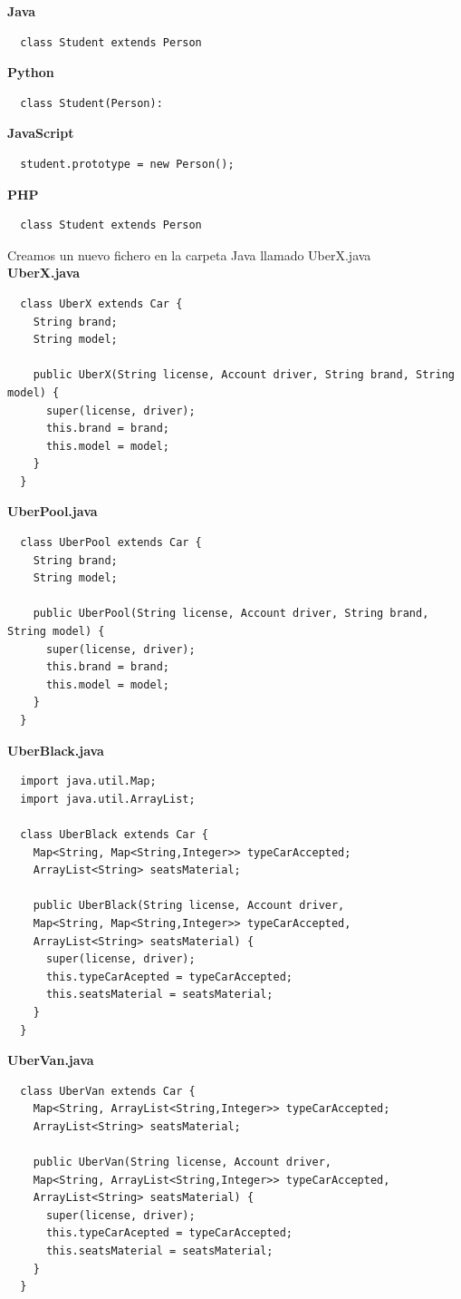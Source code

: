 \documentclass{article}
\begin{document}
\textbf{Java}
\begin{verbatim}
  class Student extends Person
\end{verbatim}

\textbf{Python}
\begin{verbatim}
  class Student(Person):
\end{verbatim}

\textbf{JavaScript}
\begin{verbatim}
  student.prototype = new Person();
\end{verbatim}

\textbf{PHP}
\begin{verbatim}
  class Student extends Person
\end{verbatim}

Creamos un nuevo fichero en la carpeta Java llamado UberX.java\\

\textbf{UberX.java}
\begin{verbatim}
  class UberX extends Car {
    String brand;
    String model;

    public UberX(String license, Account driver, String brand, String model) {
      super(license, driver);
      this.brand = brand;
      this.model = model;
    }
  }
\end{verbatim}

\textbf{UberPool.java}
\begin{verbatim}
  class UberPool extends Car {
    String brand;
    String model;

    public UberPool(String license, Account driver, String brand, String model) {
      super(license, driver);
      this.brand = brand;
      this.model = model;
    }
  }
\end{verbatim}

\textbf{UberBlack.java}
\begin{verbatim}
  import java.util.Map;
  import java.util.ArrayList;

  class UberBlack extends Car {
    Map<String, Map<String,Integer>> typeCarAccepted;
    ArrayList<String> seatsMaterial;

    public UberBlack(String license, Account driver,
    Map<String, Map<String,Integer>> typeCarAccepted,
    ArrayList<String> seatsMaterial) {
      super(license, driver);
      this.typeCarAcepted = typeCarAccepted;
      this.seatsMaterial = seatsMaterial;
    }
  }
\end{verbatim}

\textbf{UberVan.java}
\begin{verbatim}
  class UberVan extends Car {
    Map<String, ArrayList<String,Integer>> typeCarAccepted;
    ArrayList<String> seatsMaterial;

    public UberVan(String license, Account driver,
    Map<String, ArrayList<String,Integer>> typeCarAccepted,
    ArrayList<String> seatsMaterial) {
      super(license, driver);
      this.typeCarAcepted = typeCarAccepted;
      this.seatsMaterial = seatsMaterial;
    }
  }
\end{verbatim}
\end{document}
